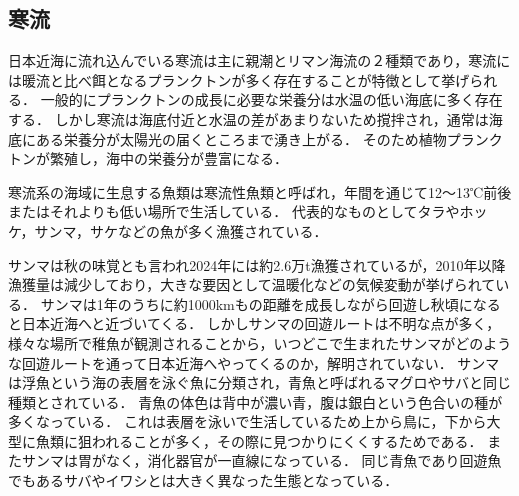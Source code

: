 \documentclass[12pt,a4j,titlepage]{ltjsarticle}
\begin{document}
\subsection{寒流}
日本近海に流れ込んでいる寒流は主に親潮とリマン海流の２種類であり，寒流には暖流と比べ餌となるプランクトンが多く存在することが特徴として挙げられる\cite{kairyuu}．
一般的にプランクトンの成長に必要な栄養分は水温の低い海底に多く存在する．
しかし寒流は海底付近と水温の差があまりないため撹拌され，通常は海底にある栄養分が太陽光の届くところまで湧き上がる．
そのため植物プランクトンが繁殖し，海中の栄養分が豊富になる．\par
寒流系の海域に生息する魚類は寒流性魚類と呼ばれ，年間を通じて12〜13℃前後またはそれよりも低い場所で生活している．
代表的なものとしてタラやホッケ，サンマ，サケなどの魚が多く漁獲されている．\par
サンマは秋の味覚とも言われ2024年には約2.6万t漁獲されているが，2010年以降漁獲量は減少しており，大きな要因として温暖化などの気候変動が挙げられている\cite{huryou}．
サンマは1年のうちに約1000kmもの距離を成長しながら回遊し秋頃になると日本近海へと近づいてくる．
しかしサンマの回遊ルートは不明な点が多く，様々な場所で稚魚が観測されることから，いつどこで生まれたサンマがどのような回遊ルートを通って日本近海へやってくるのか，解明されていない．
サンマは浮魚という海の表層を泳ぐ魚に分類され，青魚と呼ばれるマグロやサバと同じ種類とされている．
青魚の体色は背中が濃い青，腹は銀白という色合いの種が多くなっている．
これは表層を泳いで生活しているため上から鳥に，下から大型に魚類に狙われることが多く，その際に見つかりにくくするためである\cite{iro}．
またサンマは胃がなく，消化器官が一直線になっている．
同じ青魚であり回遊魚でもあるサバやイワシとは大きく異なった生態となっている．
\end{document}
